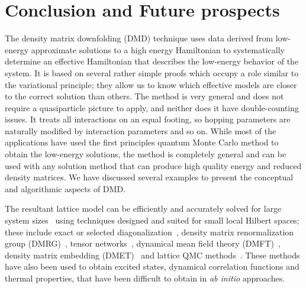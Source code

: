 \section{Conclusion and Future prospects}



The density matrix downfolding (DMD) technique uses data derived from low-energy approximate solutions to a high energy Hamiltonian to systematically determine an effective Hamiltonian that describes the low-energy behavior of the system.
It is based on several rather simple proofs which occupy a role similar to the variational principle; they allow us to know which effective models are closer to the correct solution than others. 
The method is very general and does not require a quasiparticle picture to apply, and neither does it have double-counting issues.
It treats all interactions on an equal footing, so hopping parameters are naturally modified by interaction parameters and so on.
While most of the applications have used the first principles quantum Monte Carlo method to obtain the low-energy solutions, the method is completely general and can be used with any solution method that can produce high quality energy and reduced density matrices.  
We have discussed several examples to present the conceptual and algorithmic aspects of DMD. 

The resultant lattice model can be efficiently and accurately solved for large system sizes~\cite{LeBlanc_PRX} using techniques designed and suited for small local Hilbert spaces; these include exact or selected diagonalization~\cite{DeRaedt,Tubman_selci,Holmes_Tubman_Umrigar}, density matrix renormalization group (DMRG)~\cite{White1992}, tensor networks~\cite{PEPS,Changlani_CPS,NeuscammanCPS}, dynamical mean field theory (DMFT)~\cite{Kotliar2006}, density matrix embedding (DMET)~\cite{DMET_2012} and lattice QMC methods~\cite{Scalapino, Trivedi_Ceperley, Zhang_AFQMC, Sandvik_loops, Prokofiev, 
Booth2009,SQMC,Holmes_Changlani_Umrigar, Booth2013}. 
These methods have also been used to obtain excited states, dynamical correlation functions and thermal properties, that have been difficult to obtain in \textit{ab initio} approaches. 


